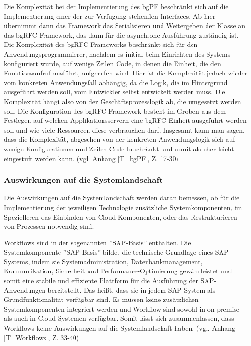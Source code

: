 Die Komplexität bei der Implementierung des bgPF beschränkt sich auf die Implementierung einer der zur Verfügung stehenden Interfaces. Ab hier übernimmt dann das Framework das Serialisieren und Weitergeben der Klasse an das bgRFC Framework, das dann für die asynchrone Ausführung zuständig ist. Die Komplexität des bgRFC Frameworks beschränkt sich für den Anwendungsprogrammierer, nachdem es initial beim Einrichten des Systems konfiguriert wurde, auf wenige Zeilen Code, in denen die Einheit, die den Funktionsaufruf ausführt, aufgerufen wird. Hier ist die Komplexität jedoch wieder vom konkreten Anwendungsfall abhängig, da die Logik, die im Hintergrund ausgeführt werden soll, vom Entwickler selbst entwickelt werden muss. Die Komplexität hängt also von der Geschäftsprozesslogik ab, die umgesetzt werden soll. Die Konfiguration des bgRFC Framework besteht im Groben aus dem Festlegen auf welchen Applikationsservern eine bgRFC-Einheit ausgeführt werden soll und wie viele Ressourcen diese verbrauchen darf. Insgesamt kann man sagen, dass die Komplexität, abgesehen von der konkreten Anwendungslogik sich auf wenige Konfigurationen und Zeilen Code beschränkt und somit als eher leicht eingestuft werden kann. (vgl. Anhang \ref{T_bgPF}, Z. 17-30)

\subsubsection{Auswirkungen auf die Systemlandschaft}

Die Auswirkungen auf die Systemlandschaft werden daran bemessen, ob für die Implementierung der jeweiligen Technologie zusätzliche Systemkomponenten, im Spezielleren das Einbinden von Cloud-Komponenten, oder das Restrukturieren von Prozessen notwendig sind.

Workflows sind in der sogenannten ''SAP-Basis'' enthalten. Die Systemkomponente ''SAP-Basis'' bildet die technische Grundlage eines SAP-Systems, indem sie Systemadministration, Datenbankmanagement, Kommunikation, Sicherheit und Performance-Optimierung gewährleistet und somit eine stabile und effiziente Plattform für die Ausführung der SAP-Anwendungen bereitstellt. Das hei{\ss}t, dass sie in jedem SAP-System als Grundfunktionalität verfügbar sind. Es müssen keine zusätzlichen Systemkomponenten integriert werden und Workflow sind sowohl in on-premise als auch in Cloud-Systemen verfügbar. Somit lässt sich zusammenfassen, dass Workflows keine Auswirkungen auf die Systemlandschaft haben. (vgl. Anhang \ref{T_Workflows}, Z. 33-40)

